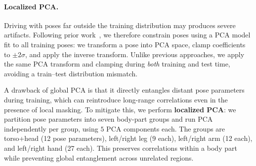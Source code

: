 \documentclass[runningheads]{llncs}
\begin{document}
\paragraph{Localized PCA.}

Driving with poses far outside the training distribution may produces severe artifacts.
Following prior work~\cite{li2024animatablegaussians, zhan2025spatialmlps}, we therefore constrain poses using a PCA model fit to all training poses: we transform a pose into PCA space, clamp coefficients to $\pm2\sigma$, and apply the inverse transform.
Unlike previous approaches, we apply the same PCA transform and clamping during \emph{both} training and test time, avoiding a train--test distribution mismatch.

A drawback of global PCA is that it directly entangles distant pose parameters during training, which can reintroduce long-range correlations even in the presence of local masking.
To mitigate this, we perform \textbf{localized PCA}: we partition pose parameters into seven body-part groups and run PCA independently per group, using $5$ PCA components each.
The groups are torso+head (12 pose parameters), left/right leg (9 each), left/right arm (12 each), and left/right hand (27 each).
This preserves correlations within a body part while preventing global entanglement across unrelated regions.


\end{document}

